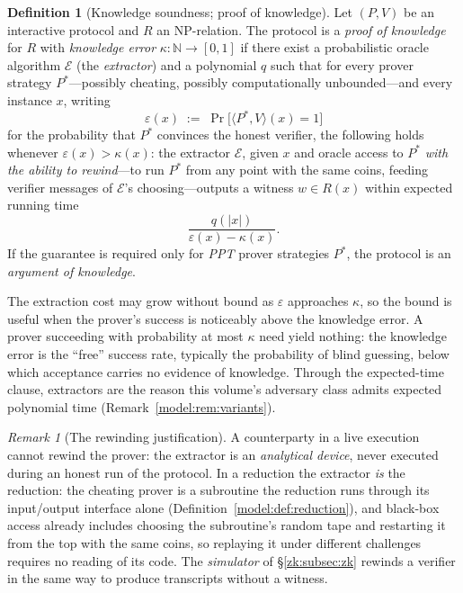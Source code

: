 \documentclass[11pt,a4paper]{article}
\theoremstyle{definition}
\newtheorem{definition}[theorem]{Definition}
\theoremstyle{remark}
\newtheorem{remark}[theorem]{Remark}
\newcommand{\N}{\ensuremath{\mathbb{N}}}
\providecommand{\abs}[1]{\lvert #1 \rvert}
\begin{document}
\begin{definition}[Knowledge soundness; proof of knowledge]
\label{zk:def:knowledge}
Let \((P, V)\) be an interactive protocol and \(R\) an NP-relation.
The protocol is a \emph{proof of knowledge} for \(R\) with
\emph{knowledge error} \(\kappa \colon \N \to [0,1]\) if there exist
a probabilistic oracle algorithm \(\mathcal E\) (the
\emph{extractor}) and a polynomial \(q\) such that for every prover
strategy \(P^{*}\)---possibly cheating, possibly computationally
unbounded---and every instance \(x\), writing
\[
\varepsilon(x) \;:=\; \Pr\bigl[\langle P^{*}, V \rangle(x) = 1\bigr]
\]
for the probability that \(P^{*}\) convinces the honest verifier, the
following holds whenever \(\varepsilon(x) > \kappa(x)\): the
extractor \(\mathcal E\), given \(x\) and oracle access to
\(P^{*}\) \emph{with the ability to rewind}---to run \(P^{*}\) from
any point with the same coins, feeding verifier messages of
\(\mathcal E\)'s choosing---outputs a witness \(w \in R(x)\) within
expected running time
\[
\frac{q(\abs{x})}{\varepsilon(x) - \kappa(x)}.
\]
If the guarantee is required only for \emph{PPT} prover strategies
\(P^{*}\), the protocol is an \emph{argument of knowledge}.
\end{definition}

The extraction cost may grow without bound as \(\varepsilon\)
approaches \(\kappa\), so the bound is useful when the prover's success
is noticeably above the knowledge error. A prover succeeding with
probability at most \(\kappa\) need yield nothing: the knowledge error
is the ``free'' success rate, typically the probability of blind
guessing, below which acceptance carries no evidence of knowledge.
Through the expected-time clause, extractors are the reason this
volume's adversary class admits expected polynomial time
(Remark~\ref{model:rem:variants}).

\begin{remark}[The rewinding justification]\label{zk:rem:rewinding}
A counterparty in a live execution cannot rewind the prover: the
extractor is an \emph{analytical device}, never executed during an
honest run of the protocol. In a reduction the extractor \emph{is} the
reduction: the cheating prover
is a subroutine the reduction runs through its input/output interface
alone (Definition~\ref{model:def:reduction}), and black-box access
already includes choosing the subroutine's random tape and restarting
it from the top with the same coins, so replaying it under different
challenges requires no reading of its code. The \emph{simulator} of
\S\ref{zk:subsec:zk} rewinds a verifier in the same way to produce
transcripts without a witness.
\end{remark}
\end{document}
